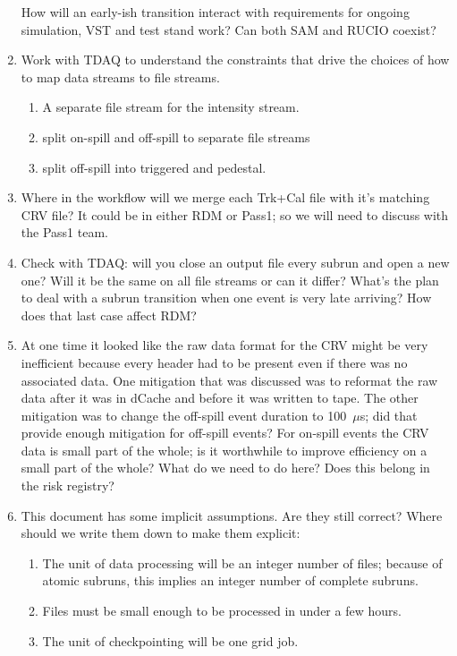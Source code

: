 \begin{enumerate}
  How will an early-ish transition interact with requirements for ongoing simulation, VST and test stand work?
  Can both SAM and RUCIO coexist?
\item Work with TDAQ to understand the constraints that drive the choices of how to
  map data streams to file streams.
  \begin{enumerate}
    \item A separate file stream for the intensity stream.
    \item split on-spill and off-spill to separate file streams
    \item split off-spill into triggered and pedestal.
  \end{enumerate}
\item Where in the workflow will we merge each Trk+Cal file with it's matching CRV file?
  It could be in either RDM or Pass1; so we will need to discuss with the Pass1 team.
\item Check with TDAQ: will you close an output file every subrun and open a new one? Will it be the same
  on all file streams or can it differ?  What's the plan to deal with a subrun transition when one
  event is very late arriving?  How does that last case affect RDM?
\item At one time it looked like the raw data format for the CRV might be very inefficient
  because every header had to be present even if there was no associated data.
  One mitigation that was discussed was to reformat the raw data after it was in dCache and before it was written to tape.
  The other mitigation was to change the off-spill event duration to 100~$\mu$s; did that provide enough mitigation for off-spill events?
  For on-spill events the CRV data is small part of the whole; is it worthwhile to improve efficiency on a small part of the whole?
  What do we need to do here?  Does this belong in the risk registry?
\item This document has some implicit assumptions.  Are they still correct?  Where should we write them down to make them explicit:
  \begin{enumerate}
  \item The unit of data processing will be an integer number of files; because of atomic subruns, this implies an integer number
    of complete subruns.
  \item Files must be small enough to be processed in under a few hours.
  \item The unit of checkpointing will be one grid job.
  \end{enumerate}
\end{enumerate}



